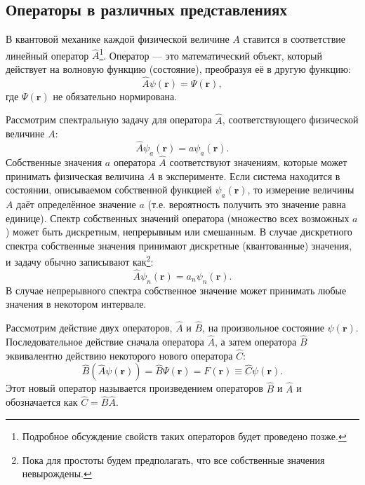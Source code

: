 \documentclass[a4paper, 12pt]{article}
\begin{document}
\subsection{Операторы в различных представлениях}
В квантовой механике каждой физической величине $A$ ставится в соответствие
линейный оператор $\hat{A}$\footnote{Подробное обсуждение свойств таких операторов будет проведено позже.}. Оператор --- это математический объект, который действует на волновую функцию (состояние), преобразуя её в другую функцию:
\begin{equation}
    \hat{A} \psi(\bm{r}) = \Psi(\bm{r}),
\end{equation}
где $\Psi(\bm{r})$ не обязательно нормирована.

Рассмотрим спектральную задачу для оператора $\hat{A}$, соответствующего физической величине $A$:
\begin{equation}
    \hat{A} \psi_a(\bm{r}) = a \psi_a(\bm{r}).
\end{equation}
Собственные значения $a$ оператора $\hat{A}$ соответствуют значениям, которые может принимать физическая величина $A$ в эксперименте. Если система находится в состоянии, описываемом собственной функцией $\psi_a(\bm{r})$, то измерение величины $A$ даёт определённое значение $a$ (т.е. вероятность получить это значение равна единице). Спектр собственных значений оператора (множество всех возможных $a$) может быть дискретным, непрерывным или смешанным. В случае дискретного спектра собственные значения принимают дискретные (квантованные) значения, и задачу обычно записывают как\footnote{Пока для простоты будем предполагать, что все собственные значения невырождены.}:
\begin{equation}
    \hat{A} \psi_n(\bm{r}) = a_n \psi_n(\bm{r}).
\end{equation}
В случае непрерывного спектра собственное значение может принимать любые значения в некотором интервале.

Рассмотрим действие двух операторов, $\hat{A}$ и $\hat{B}$, на произвольное состояние $\psi(\bm{r})$. Последовательное действие сначала оператора $\hat{A}$, а затем оператора $\hat{B}$ эквивалентно действию некоторого нового оператора $\hat{C}$:
\begin{equation}
    \hat{B} \left( \hat{A} \psi(\bm{r}) \right) = \hat{B} \Psi(\bm{r}) = F(\bm{r}) \equiv \hat{C} \psi(\bm{r}).
\end{equation}
Этот новый оператор называется произведением операторов $\hat{B}$ и $\hat{A}$ и обозначается как $\hat{C} = \hat{B}\hat{A}$.
\end{document}
